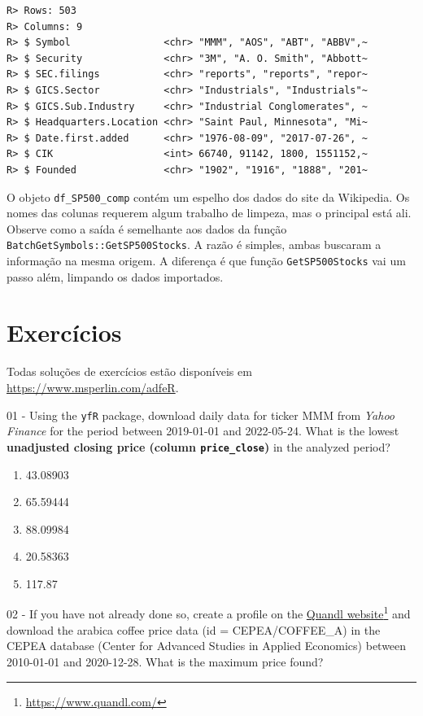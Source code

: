 \documentclass[
  11pt,
]{book}
\providecommand{\tightlist}{%
  \setlength{\itemsep}{0pt}\setlength{\parskip}{0pt}}
\begin{document}
\begin{verbatim}
R> Rows: 503
R> Columns: 9
R> $ Symbol                <chr> "MMM", "AOS", "ABT", "ABBV",~
R> $ Security              <chr> "3M", "A. O. Smith", "Abbott~
R> $ SEC.filings           <chr> "reports", "reports", "repor~
R> $ GICS.Sector           <chr> "Industrials", "Industrials"~
R> $ GICS.Sub.Industry     <chr> "Industrial Conglomerates", ~
R> $ Headquarters.Location <chr> "Saint Paul, Minnesota", "Mi~
R> $ Date.first.added      <chr> "1976-08-09", "2017-07-26", ~
R> $ CIK                   <int> 66740, 91142, 1800, 1551152,~
R> $ Founded               <chr> "1902", "1916", "1888", "201~
\end{verbatim}

O objeto \texttt{df\_SP500\_comp} contém um espelho dos dados do site da Wikipedia. Os nomes das colunas requerem algum trabalho de limpeza, mas o principal está ali. Observe como a saída é semelhante aos dados da função \texttt{BatchGetSymbols::GetSP500Stocks}. A razão é simples, ambas buscaram a informação na mesma origem. A diferença é que função \texttt{GetSP500Stocks} vai um passo além, limpando os dados importados.

\hypertarget{exerc-importacao-pacotes}{%
\section{Exercícios}\label{exerc-importacao-pacotes}}

Todas soluções de exercícios estão disponíveis em \url{https://www.msperlin.com/adfeR}.

01 -
Using the \texttt{yfR} package, download daily data for ticker MMM from \emph{Yahoo Finance} for the period between 2019-01-01 and 2022-05-24. What is the lowest \textbf{unadjusted closing price (column \texttt{price\_close})} in the analyzed period?

\begin{enumerate}
\def\labelenumi{\alph{enumi})}
\tightlist
\item
  43.08903
\item
  65.59444
\item
  88.09984
\item
  20.58363
\item
  117.87
\end{enumerate}

02 -
If you have not already done so, create a profile on the \href{https://www.quandl.com/}{Quandl website}\footnote{\url{https://www.quandl.com/}} and download the arabica coffee price data (id = CEPEA/COFFEE\_A) in the CEPEA database (Center for Advanced Studies in Applied Economics) between 2010-01-01 and 2020-12-28. What is the maximum price found?
\end{document}
